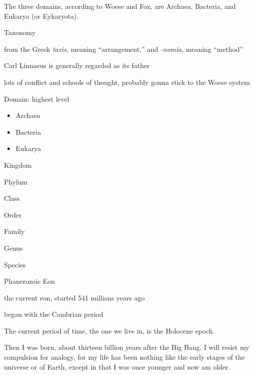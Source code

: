 \documentclass[./butidigress.tex]{subfiles}
\begin{document}
The three domains, according to Woese and Fox, are Archaea, Bacteria, and Eukarya (or Eykaryota).



\begin{somenotes}{Taxonomy}
    \item from the Greek \emph{taxis}, meaning \enquote{arrangement,} and \emph{-nomia}, meaning \enquote{method}
    \item Carl Linnaeus is generally regarded as its father
    \item lots of conflict and schools of thought, probably gonna stick to the Woese system\autocite{woeseorignial}
    \item Domain: highest level
    \begin{itemize}
        \item Archaea
        \item Bacteria
        \item Eukarya
    \end{itemize}
    \item Kingdom
    \item Phylum
    \item Class
    \item Order
    \item Family
    \item Genus
    \item Species
\end{somenotes}


\begin{somenotes}{Phanerozoic Eon}
    \item the current eon, started \num{541} millions years ago
    \item began with the Cambrian period
\end{somenotes}

The current period of time, the one we live in, is the Holocene epoch.




Then I was born, about thirteen billion years after the Big Bang.
I will resist my compulsion for analogy, for my life has been nothing like the early stages of the universe or of Earth, except in that I was once younger and now am older.

\end{document}
